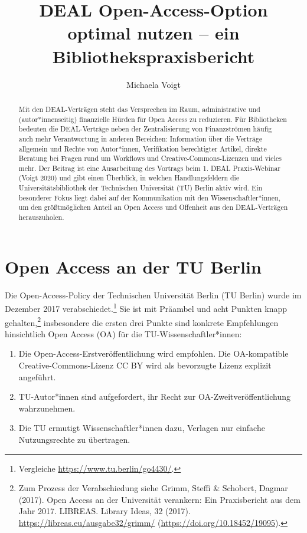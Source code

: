 \documentclass[a4paper,
fontsize=11pt,
oneside,
numbers=noperiodatend,
parskip=half-,
bibliography=totoc,
final
]{scrartcl}
\title{\LARGE{DEAL Open-Access-Option optimal nutzen -- ein Bibliothekspraxisbericht}}
\author{Michaela Voigt} %
\date{}
\begin{document}
\maketitle
\thispagestyle{fancyplain} 

\begin{abstract}
\noindent
Mit den DEAL-Verträgen steht das Versprechen im Raum, administrative und
(autor*innenseitig) finanzielle Hürden für Open Access zu reduzieren.
Für Bibliotheken bedeuten die DEAL-Verträge neben der Zentralisierung
von Finanzströmen häufig auch mehr Verantwortung in anderen Bereichen:
Information über die Verträge allgemein und Rechte von Autor*innen,
Verifikation berechtigter Artikel, direkte Beratung bei Fragen rund um
Workflows und Creative-Commons-Lizenzen und vieles mehr. Der Beitrag ist
eine Ausarbeitung des Vortrags beim 1. DEAL Praxis-Webinar (Voigt 2020)
und gibt einen Überblick, in welchen Handlungsfeldern die
Universitätsbibliothek der Technischen Universität (TU) Berlin aktiv
wird. Ein besonderer Fokus liegt dabei auf der Kommunikation mit den
Wissenschaftler*innen, um den größtmöglichen Anteil an Open Access und
Offenheit aus den DEAL-Verträgen herauszuholen.
\end{abstract}

\hypertarget{open-access-an-der-tu-berlin}{%
\section{Open Access an der TU
Berlin}\label{open-access-an-der-tu-berlin}}

Die Open-Access-Policy der Technischen Universität Berlin (TU Berlin)
wurde im Dezember 2017 verabschiedet.\footnote{Vergleiche
  \url{https://www.tu.berlin/go4430/}.} Sie ist mit Präambel und acht
Punkten knapp gehalten,\footnote{Zum Prozess der Verabschiedung siehe
  Grimm, Steffi \& Schobert, Dagmar (2017). Open Access an der
  Universität verankern: Ein Praxisbericht aus dem Jahr 2017. LIBREAS.
  Library Ideas, 32 (2017). \url{https://libreas.eu/ausgabe32/grimm/}
  (\url{https://doi.org/10.18452/19095}).} insbesondere die ersten drei
Punkte sind konkrete Empfehlungen hinsichtlich Open Access (OA) für die
TU-Wissenschaftler*innen:

\begin{enumerate}
\def\labelenumi{\arabic{enumi}.}
\item
  Die Open-Access-Erstveröffentlichung wird empfohlen. Die OA-kompatible
  Creative-Com\-mons-Lizenz CC BY wird als bevorzugte Lizenz explizit
  angeführt.
\item
  TU-Autor*innen sind aufgefordert, ihr Recht zur
  OA-Zweitveröffentlichung wahrzunehmen.
\item
  Die TU ermutigt Wissenschaftler*innen dazu, Verlagen nur einfache
  Nutzungsrechte zu übertragen.
\end{enumerate}
\end{document}
